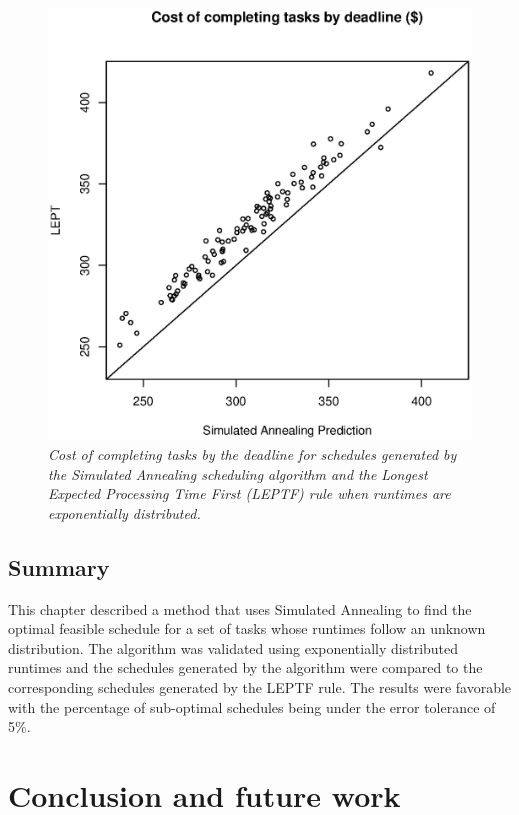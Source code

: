 \documentclass[12pt]{report}
\begin{document}
\begin{figure}
\includegraphics[width=1\textwidth]{validate-SA-LEPT-costs-2inst-100iter-10tasks.eps}
\caption{\textit{Cost of completing tasks by the deadline for schedules generated by the Simulated Annealing scheduling algorithm and the Longest Expected Processing Time First (LEPTF) rule when runtimes are exponentially distributed.}}
\label{fig:validate-SA-LEPT-costs-2inst-100iter-10tasks}
\end{figure}


\section{Summary}
This chapter described a method that uses Simulated Annealing to find the optimal feasible schedule for a set of tasks whose runtimes follow an unknown distribution.
The algorithm was validated using exponentially distributed runtimes and the schedules generated by the algorithm were compared to the corresponding schedules generated by the LEPTF rule.
The results were favorable with the percentage of sub-optimal schedules being under the error tolerance of 5\%.


\chapter{Conclusion and future work}
\end{document}

